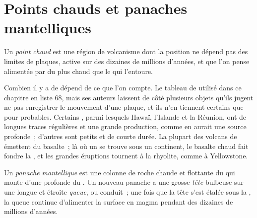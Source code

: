\section{Points chauds et panaches mantelliques}\label{sec:b1:hotspots:plumes}

\begin{definition}\label{def:b1:hotspots:hotspot}
Un \emph{point chaud} est une région de volcanisme dont la position ne dépend
pas des limites de plaques, active sur des dizaines de millions d'années,
et que l'on pense alimentée par du  plus chaud que le  qui l'entoure.
\end{definition}

Combien il y a de  dépend de ce que l'on compte. Le tableau de 
utilisé dans ce chapitre en liste 68, mais ses auteurs laissent de côté plusieurs
objets qu'ils jugent ne pas enregistrer le mouvement d'une plaque, et ils n'en tiennent certains
que pour probables. Certains , parmi lesquels Hawaï, l'Islande et
la Réunion, ont de longues traces régulières et une grande production, comme en aurait une source
profonde~; d'autres sont petits et de courte durée. La plupart des volcans de  émettent du basalte~;
là où un  se trouve sous un continent, le basalte chaud fait fondre la , et
les grandes éruptions tournent à la rhyolite, comme à Yellowstone.

\begin{definition}\label{def:b1:hotspots:plume}
Un \emph{panache mantellique} est une colonne de roche chaude et flottante du 
qui monte d'une  profonde du . Un nouveau panache
a une grosse \emph{tête} bulbeuse sur une longue et étroite \emph{queue}, ou conduit~; une fois
que la tête s'est étalée sous la , la queue continue d'alimenter la
surface en magma pendant des dizaines de millions d'années.
\end{definition}

